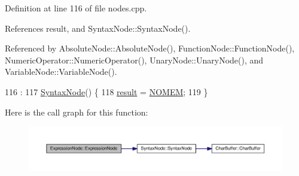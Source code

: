 Definition at line 116 of file nodes.\+cpp.



References result, and Syntax\+Node\+::\+Syntax\+Node().



Referenced by Absolute\+Node\+::\+Absolute\+Node(), Function\+Node\+::\+Function\+Node(), Numeric\+Operator\+::\+Numeric\+Operator(), Unary\+Node\+::\+Unary\+Node(), and Variable\+Node\+::\+Variable\+Node().


\begin{DoxyCode}
116                                :
117     \hyperlink{classSyntaxNode_ac94372d402f38a118b4e8cd20ba7e520}{SyntaxNode}() \{
118     \hyperlink{classExpressionNode_a1f590649f5a5cb30eb7ee912f7bc1262}{result} = \hyperlink{platform_8h_a46ff2bfbf0d44b8466a2251d5bd5e6f8}{NOMEM};
119 \}
\end{DoxyCode}


Here is the call graph for this function\+:\nopagebreak
\begin{figure}[H]
\begin{center}
\leavevmode
\includegraphics[width=350pt]{classExpressionNode_adc8888de5329d356224c8a93f3ce2b75_cgraph}
\end{center}
\end{figure}




